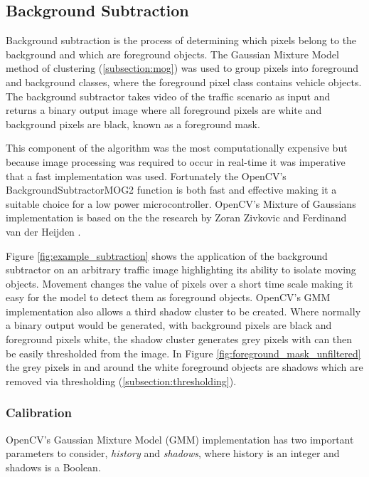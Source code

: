 \subsection{Background Subtraction}
\label{subsection:training}

Background subtraction is the process of determining which pixels belong to the background and which are foreground objects. The Gaussian Mixture Model method of clustering (\ref{subsection:mog}) was used to group pixels into foreground and background classes, where the foreground pixel class contains vehicle objects. The background subtractor takes video of the traffic scenario as input and returns a binary output image where all foreground pixels are white and background pixels are black, known as a foreground mask. 

This component of the algorithm was the most computationally expensive but because image processing was required to occur in real-time it was imperative that a fast implementation was used. Fortunately the OpenCV's BackgroundSubtractorMOG2 function \cite{opencv_mog2} is both fast and effective making it a suitable choice for a low power microcontroller. OpenCV's Mixture of Gaussians implementation is based on the the research by Zoran Zivkovic and Ferdinand van der Heijden \cite{zivkovic_pattern_recognition} \cite{zivkovic_heijden_pattern_recognition_letters}.

Figure \ref{fig:example_subtraction} shows the application of the background subtractor on an arbitrary traffic image highlighting its ability to isolate moving objects. Movement changes the value of pixels over a short time scale making it easy for the model to detect them as foreground objects. OpenCV's GMM implementation also allows a third shadow cluster to be created. Where normally a binary output would be generated, with background pixels are black and foreground pixels white, the shadow cluster generates grey pixels with can then be easily thresholded from the image. In Figure \ref{fig:foreground_mask_unfiltered} the grey pixels in and around the white foreground objects are shadows which are removed via thresholding (\ref{subsection:thresholding}).

\subsubsection{Calibration}

OpenCV's Gaussian Mixture Model (GMM) implementation has two important parameters to consider, \emph{history} and \emph{shadows}, where history is an integer and shadows is a Boolean. 

